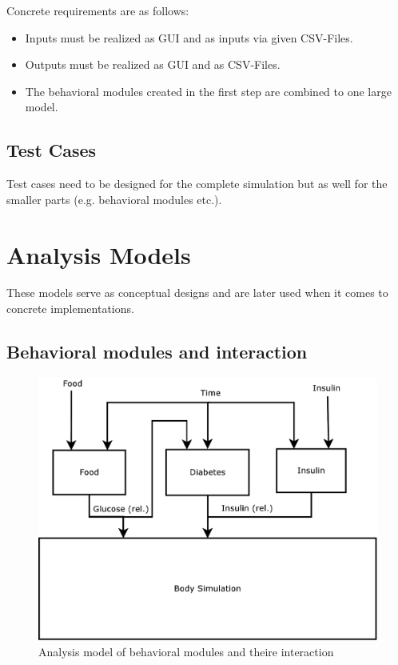 \documentclass[pdflatex,a4paper,11pt,english]{scrreprt}
\begin{document}
Concrete requirements are as follows:
\begin{itemize}
  \item Inputs must be realized as GUI and as inputs via given CSV-Files.
  \item Outputs must be realized as GUI and as CSV-Files.
  \item The behavioral modules created in the first step are combined to one
  large model.
\end{itemize} 

\subsection{Test Cases}
Test cases need to be designed for the complete simulation but as well for the
smaller parts (e.g. behavioral modules etc.).


\newpage

\section{Analysis Models}
These models serve as conceptual designs and are later used when it comes to
concrete implementations.

\subsection{Behavioral modules and interaction}

\begin{figure}[htb]
\centering
\includegraphics[scale=0.4]{images/Analysis_Model}
\caption{Analysis model of behavioral modules and theire interaction}
\label{fig:analysis_model_behavioral_modules}
\end{figure}
\end{document}
